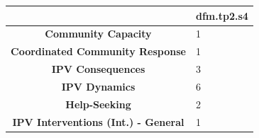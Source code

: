 \documentclass[]{tufte-handout}
\begin{document}
\begin{longtable}[]{@{}cl@{}}
\toprule
\begin{minipage}[b]{0.54\columnwidth}\centering\strut
~\strut
\end{minipage} & \begin{minipage}[b]{0.16\columnwidth}\raggedright\strut
dfm.tp2.s4\strut
\end{minipage}\tabularnewline
\midrule
\endhead
\begin{minipage}[t]{0.54\columnwidth}\centering\strut
\textbf{Community Capacity}\strut
\end{minipage} & \begin{minipage}[t]{0.16\columnwidth}\raggedright\strut
1\strut
\end{minipage}\tabularnewline
\begin{minipage}[t]{0.54\columnwidth}\centering\strut
\textbf{Coordinated Community Response}\strut
\end{minipage} & \begin{minipage}[t]{0.16\columnwidth}\raggedright\strut
1\strut
\end{minipage}\tabularnewline
\begin{minipage}[t]{0.54\columnwidth}\centering\strut
\textbf{IPV Consequences}\strut
\end{minipage} & \begin{minipage}[t]{0.16\columnwidth}\raggedright\strut
3\strut
\end{minipage}\tabularnewline
\begin{minipage}[t]{0.54\columnwidth}\centering\strut
\textbf{IPV Dynamics}\strut
\end{minipage} & \begin{minipage}[t]{0.16\columnwidth}\raggedright\strut
6\strut
\end{minipage}\tabularnewline
\begin{minipage}[t]{0.54\columnwidth}\centering\strut
\textbf{Help-Seeking}\strut
\end{minipage} & \begin{minipage}[t]{0.16\columnwidth}\raggedright\strut
2\strut
\end{minipage}\tabularnewline
\begin{minipage}[t]{0.54\columnwidth}\centering\strut
\textbf{IPV Interventions (Int.) - General}\strut
\end{minipage} & \begin{minipage}[t]{0.16\columnwidth}\raggedright\strut
1\strut
\end{minipage}\tabularnewline

\end{longtable}
\end{document}
